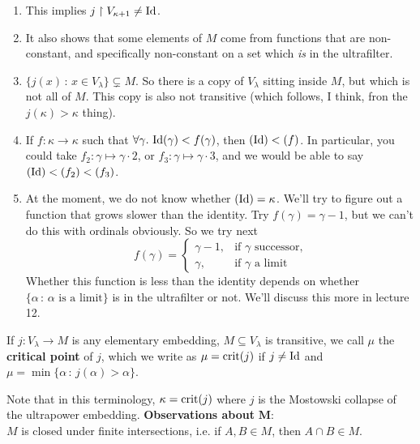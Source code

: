 \documentclass{article}
\begin{document}
\begin{remark*}\hspace{0.1cm}
    \begin{enumerate}
        \item This implies $j \upharpoonright V_{\kappa+1} \neq \operatorname{Id}$.
        \item It also shows that some elements of $M$ come from functions that are non-constant, and specifically non-constant on a set which \textit{is} in the ultrafilter.
        \item $\{j(x) \, : \, x \in V_{\lambda}\} \subsetneq M$. So there is a copy of $V_{\lambda}$ sitting inside $M$, but which is not all of $M$. This copy is also not transitive (which follows, I think, fron the $j(\kappa)>\kappa$ thing).
        \item If $f: \kappa \to \kappa$ such that $\forall \gamma. \, \operatorname{Id}(\gamma) < f(\gamma)$, then $(\operatorname{Id})<(f)$. In particular, you could take $f_{2}: \gamma \mapsto \gamma \cdot 2$, or $f_{3} : \gamma \mapsto \gamma \cdot 3$, and we would be able to say $(\operatorname{Id})<(f_{2})<(f_{3})$.
        \item At the moment, we do not know whether $(\operatorname{Id})=\kappa$. We'll try to figure out a function that grows slower than the identity. Try $f(\gamma) = \gamma -1$, but we can't do this with ordinals obviously. So we try next \[ f(\gamma) = \begin{cases}
            \gamma - 1, & \text{if $\gamma$ successor,}\\
            \gamma, & \text{if $\gamma$ a limit}
        \end{cases}\]
        Whether this function is less than the identity depends on whether $\{\alpha \, : \, \alpha \text{ is a limit}\}$ is in the ultrafilter or not. We'll discuss this more in lecture 12.
    \end{enumerate}    
\end{remark*}
\begin{fancydefine}{}
    If $j : V_{\lambda} \to M$ is any elementary embedding, $M \subseteq V_{\lambda}$ is transitive, we call $\mu$ the \textbf{critical point} of $j$, which we write as $\mu = \operatorname{crit}(j)$ if $j \neq \operatorname{Id}$ and $\mu = \min\{\alpha \, : \, j(\alpha)>\alpha\}$.
\end{fancydefine}
Note that in this terminology, $\kappa = \operatorname{crit}(j)$ where $j$ is the Mostowski collapse of the ultrapower embedding.\gap 
\textbf{Observations about }$\mathbf{M}$:\\ 
$M$ is closed under finite intersections, i.e. if $A,B \in M$, then $A \cap B \in M$. \gap 
\end{document}
